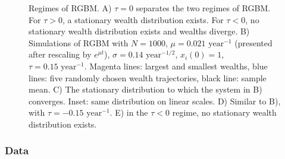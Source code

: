 \begin{figure}[!htb]
\caption{Regimes of RGBM. A) $\tau=0$ separates the two regimes of RGBM. For $\tau>0$, a stationary wealth distribution exists. For $\tau<0$, no stationary wealth distribution exists and wealths diverge. B) Simulations of RGBM with $N=1000$, $\mu=0.021 \text{ year}^{-1}$ (presented after rescaling by $e^{\mu t}$), $\sigma=0.14\text{ year}^{-1/2}$, $x_i\left(0\right)=1$, $\tau=0.15 \text{ year}^{-1}$. Magenta lines: largest and smallest wealths, blue lines: five randomly chosen wealth trajectories, black line: sample mean. C) The stationary distribution to which the system in B) converges. Inset: same distribution on linear scales. D) Similar to B), with $\tau=-0.15 \text{ year}^{-1}$. E) in the $\tau<0$ regime, no stationary wealth distribution exists.}
\end{figure}

\subsubsection{Data}\label{sec:data}

